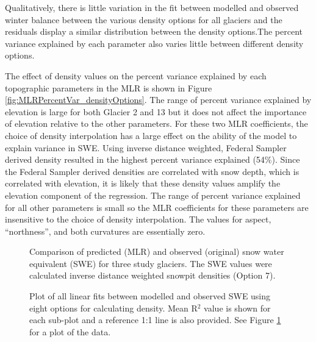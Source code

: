 \documentclass[12pt]{article}
\begin{document}
Qualitatively, there is little variation in the fit between modelled and observed winter balance between the various density options for all glaciers and the residuals display a similar distribution between the density options.The percent variance explained by each parameter also varies little between different density options. 

The effect of density values on the percent variance explained by each topographic parameters in the MLR is shown in Figure \ref{fig:MLRPercentVar_densityOptions}. The range of percent variance explained by elevation is large for both Glacier 2 and 13 but it does not affect the importance of elevation relative to the other parameters. For these two MLR coefficients, the choice of density interpolation has a large effect on the ability of the model to explain variance in SWE. Using inverse distance weighted, Federal Sampler derived density resulted in the highest percent variance explained (54\%). Since the Federal Sampler derived densities are correlated with snow depth, which is correlated with elevation, it is likely that these density values amplify the elevation component of the regression. The range of percent variance explained for all other parameters is small so the MLR coefficients for these parameters are insensitive to the choice of density interpolation. The values for aspect, ``northness'', and both curvatures are essentially zero. 

\begin{figure}[H]
	\caption{Comparison of predicted (MLR) and observed (original) snow water equivalent (SWE) for three study glaciers. The SWE values were calculated inverse distance weighted snowpit densities (Option 7).}
	\label{fig:MLRfit_opt8}
\end{figure}


\begin{figure}[H]
	\caption{Plot of all linear fits between modelled and observed SWE using eight options for calculating density. Mean R$^2$ value is shown for each sub-plot and a reference 1:1 line is also provided. See Figure \ref{fig:MLRfit_opt8} for a plot of the data. }
	\label{fig:MLRfit_allLines}
\end{figure}
\end{document}
